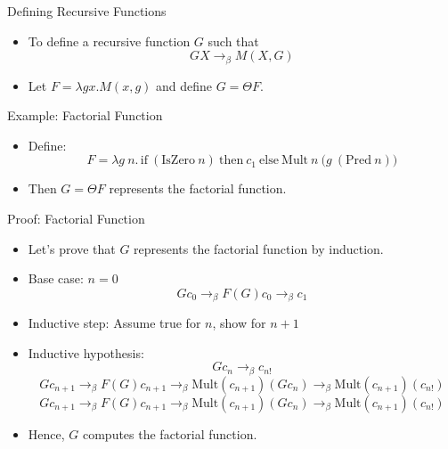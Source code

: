\documentclass{beamer}
\begin{document}
\begin{frame}{Defining Recursive Functions}
  \begin{itemize}
    \item To define a recursive function \(G\) such that
      \[
      G X \rightarrow_\beta M(X, G)
      \]
    \item Let \(F = \lambda g x. M(x, g)\) and define \(G = \Theta F\).
  \end{itemize}
\end{frame}

\begin{frame}{Example: Factorial Function}
  \begin{itemize}
    \item Define:
      \[
      F = \lambda g\ n.\, \text{if}\ (\text{IsZero}\ n)\ \text{then}\ c_1\ \text{else}\ \text{Mult}\ n\ \bigl(g\ (\text{Pred}\ n)\bigr)
      \]
    \item Then \(G = \Theta F\) represents the factorial function.
  \end{itemize}
  \vspace{-0.5em} %
\end{frame}

\begin{frame}{Proof: Factorial Function}
  \begin{itemize}
    \item Let's prove that \(G\) represents the factorial function by induction.
    \item Base case: \(n = 0\)
      \[
      G c_0 \rightarrow_\beta F (G) c_0 \rightarrow_\beta c_1
      \]
    \item Inductive step: Assume true for \(n\), show for \(n+1\)
    \item   Inductive hypothesis:
      \[
      G c_n \rightarrow_\beta c_{n!}
      \]
      \[
      G c_{n+1} \rightarrow_\beta F (G) c_{n+1} \rightarrow_\beta \text{Mult} (c_{n+1}) (G c_n) \rightarrow_\beta \text{Mult} (c_{n+1}) (c_{n!})
      \]
      \[
      G c_{n+1} \rightarrow_\beta F (G) c_{n+1} \rightarrow_\beta \text{Mult} (c_{n+1}) (G c_n) \rightarrow_\beta \text{Mult} (c_{n+1}) (c_{n!})
      \]
    \item Hence, \(G\) computes the factorial function.
  \end{itemize}
  \vspace{-0.5em} %
\end{frame}
 

\end{document}
